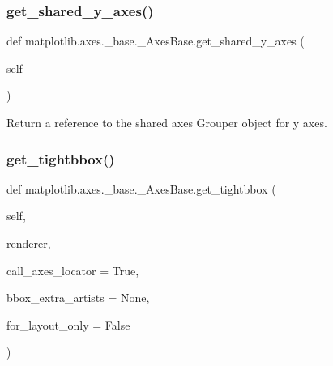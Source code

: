 \subsubsection{\texorpdfstring{get\+\_\+shared\+\_\+y\+\_\+axes()}{get\_shared\_y\_axes()}}
{\footnotesize\ttfamily def matplotlib.\+axes.\+\_\+base.\+\_\+\+Axes\+Base.\+get\+\_\+shared\+\_\+y\+\_\+axes (\begin{DoxyParamCaption}\item[{}]{self }\end{DoxyParamCaption})}

\begin{DoxyVerb}Return a reference to the shared axes Grouper object for y axes.\end{DoxyVerb}
 \mbox{\label{classmatplotlib_1_1axes_1_1__base_1_1__AxesBase_ae7804f291d9ca2bb96c76e81d3b0c36d}} 
\subsubsection{\texorpdfstring{get\+\_\+tightbbox()}{get\_tightbbox()}}
{\footnotesize\ttfamily def matplotlib.\+axes.\+\_\+base.\+\_\+\+Axes\+Base.\+get\+\_\+tightbbox (\begin{DoxyParamCaption}\item[{}]{self,  }\item[{}]{renderer,  }\item[{}]{call\+\_\+axes\+\_\+locator = {\ttfamily True},  }\item[{}]{bbox\+\_\+extra\+\_\+artists = {\ttfamily None},  }\item[{}]{for\+\_\+layout\+\_\+only = {\ttfamily False} }\end{DoxyParamCaption})}

